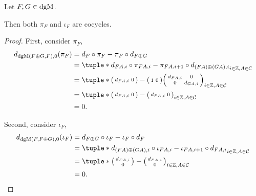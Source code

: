 \begin{lemma}
    \label{lem:dgm_pi_iota_cocycles}
    Let \( F, G \in \operatorname{dgM} \).
    
    Then both \( \pi_F \) and \( \iota_F \) are cocycles.
\end{lemma}
\begin{proof}
    First, consider \( \pi_F \),
    \begin{align*}
        d_{\dgM(F \oplus G, F), 0} ( \pi_F ) &= d_F \circ \pi_F - \pi_F \circ d_{F \oplus G} \\
        &= \tuple*{ d_{F A, i} \circ \pi_{F A, i} - \pi_{F A, i + 1} \circ d_{(F A) \oplus (G A), i} }_{i \in \Zb, A \in \Cc} \\
        &= \tuple*{
            \begin{psmallmatrix}
                d_{F A, i} & 0
            \end{psmallmatrix}
            -
            \begin{psmallmatrix}
                1 & 0
            \end{psmallmatrix}
            \begin{psmallmatrix}
                d_{F A, i} & 0 \\
                0 & d_{G A, i}
            \end{psmallmatrix}
        }_{i \in \Zb, A \in \Cc} \\
        &= \tuple*{
            \begin{psmallmatrix}
                d_{F A, i} & 0
            \end{psmallmatrix}
            -
            \begin{psmallmatrix}
                d_{F A, i} & 0
            \end{psmallmatrix}
        }_{i \in \Zb, A \in \Cc} \\
        &= 0.
    \end{align*}

    Second, consider \( \iota_F \),
    \begin{align*}
        d_{\dgM(F, F \oplus G), 0} ( \iota_F ) &= d_{F \oplus G} \circ \iota_F - \iota_F \circ d_F \\
        &= \tuple*{ d_{(F A) \oplus (G A), i} \circ \iota_{F A, i} - \iota_{F A, i + 1} \circ d_{F A, i} }_{i \in \Zb, A \in \Cc} \\
        &= \tuple*{
            \begin{psmallmatrix}
                d_{F A, i} \\
                0
            \end{psmallmatrix}
            -
            \begin{psmallmatrix}
                d_{F A, i} \\
                0
            \end{psmallmatrix}
        }_{i \in \Zb, A \in \Cc} \\
        &= 0. \qedhere
    \end{align*}
\end{proof}

